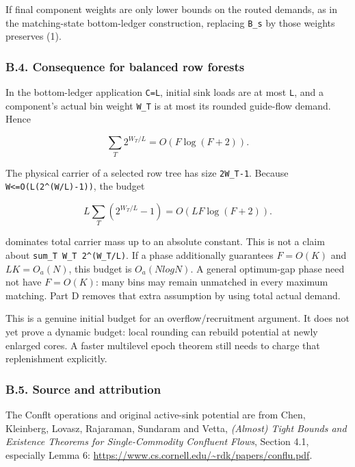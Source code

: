 If final component weights are only lower bounds on the routed demands, as in the matching-state bottom-ledger construction, replacing \texttt{B\_s} by those weights preserves (1).

\hypertarget{af-385fd70686-b.4.-consequence-for-balanced-row-forests}{%
\subsubsection{B.4. Consequence for balanced row forests}\label{af-385fd70686-b.4.-consequence-for-balanced-row-forests}}

In the bottom-ledger application \texttt{C=L}, initial sink loads are at most \texttt{L}, and a component's actual bin weight \texttt{W\_T} is at most its rounded guide-flow demand. Hence

\[
\sum_T2^{W_T/L}=O(F\log(F+2)).\tag{3}
\]

The physical carrier of a selected row tree has size \texttt{2W\_T-1}. Because \texttt{W\textless{}=O(L(2\^{}(W/L)-1))}, the budget

\[
L\sum_T(2^{W_T/L}-1)=O(LF\log(F+2)).
\]

dominates total carrier mass up to an absolute constant. This is not a claim about \texttt{sum\_T\ W\_T\ 2\^{}(W\_T/L)}. If a phase additionally guarantees \(F=O(K)\) and \(LK=O_a(N)\), this budget is \(O_a(N log N)\). A general optimum-gap phase need not have \(F=O(K)\): many bins may remain unmatched in every maximum matching. Part D removes that extra assumption by using total actual demand.

This is a genuine initial budget for an overflow/recruitment argument. It does not yet prove a dynamic budget: local rounding can rebuild potential at newly enlarged cores. A faster multilevel epoch theorem still needs to charge that replenishment explicitly.

\hypertarget{af-385fd70686-b.5.-source-and-attribution}{%
\subsubsection{B.5. Source and attribution}\label{af-385fd70686-b.5.-source-and-attribution}}

The Conflt operations and original active-sink potential are from Chen, Kleinberg, Lovasz, Rajaraman, Sundaram and Vetta, \emph{(Almost) Tight Bounds and Existence Theorems for Single-Commodity Confluent Flows}, Section 4.1, especially Lemma 6: \url{https://www.cs.cornell.edu/~rdk/papers/conflu.pdf}.

